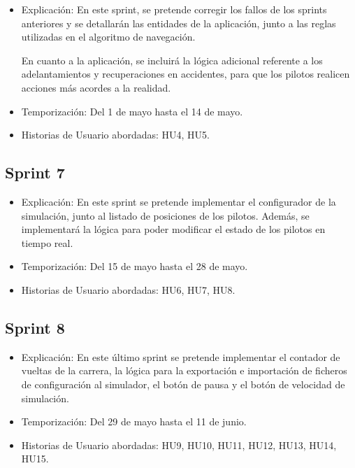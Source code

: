\begin{itemize}
    \item Explicación: En este sprint, se pretende corregir los fallos de los sprints anteriores y se detallarán las entidades de la aplicación, junto a las reglas utilizadas en el algoritmo de navegación.
    
    En cuanto a la aplicación, se incluirá la lógica adicional referente a los adelantamientos y recuperaciones en accidentes, para que los pilotos realicen acciones más acordes a la realidad.
    

    \item Temporización: Del 1 de mayo hasta el 14 de mayo.
    \item Historias de Usuario abordadas: HU4, HU5.
\end{itemize}

\subsection{Sprint 7}

\begin{itemize}
    \item Explicación: En este sprint se pretende implementar el configurador de la simulación, junto al listado de posiciones de los pilotos. Además, se implementará la lógica para poder modificar el estado de los pilotos en tiempo real.
    
    
    
    \item Temporización: Del 15 de mayo hasta el 28 de mayo.
    \item Historias de Usuario abordadas: HU6, HU7, HU8.
\end{itemize}

\subsection{Sprint 8}

\begin{itemize}
    \item Explicación: En este último sprint se pretende implementar el contador de vueltas de la carrera, la lógica para la exportación e importación de ficheros de configuración al simulador, el botón de pausa y el botón de velocidad de simulación.
    \item Temporización: Del 29 de mayo hasta el 11 de junio.
    \item Historias de Usuario abordadas: HU9, HU10, HU11, HU12, HU13, HU14, HU15.
\end{itemize}


